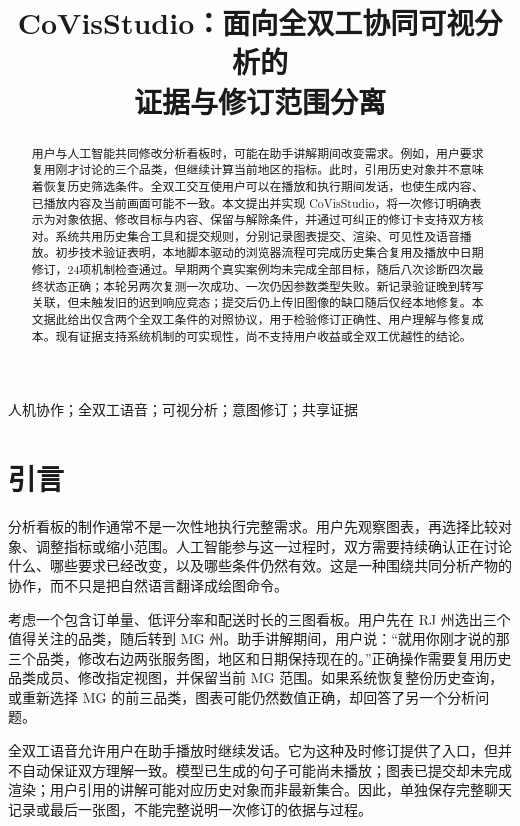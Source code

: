 \documentclass[conference]{IEEEtran}
\title{CoVisStudio：面向全双工协同可视分析的\\证据与修订范围分离}
\author{\IEEEauthorblockN{匿名作者：中文审阅稿}
\IEEEauthorblockA{方法、系统实现与初步技术验证\\正式用户对照实验尚未开展}}
\newcommand{\sys}{CoVisStudio}
\begin{document}
\maketitle

\begin{abstract}
用户与人工智能共同修改分析看板时，可能在助手讲解期间改变需求。例如，用户要求复用刚才讨论的三个品类，但继续计算当前地区的指标。此时，引用历史对象并不意味着恢复历史筛选条件。全双工交互使用户可以在播放和执行期间发话，也使生成内容、已播放内容及当前画面可能不一致。本文提出并实现 \sys，将一次修订明确表示为对象依据、修改目标与内容、保留与解除条件，并通过可纠正的修订卡支持双方核对。系统共用历史集合工具和提交规则，分别记录图表提交、渲染、可见性及语音播放。初步技术验证表明，本地脚本驱动的浏览器流程可完成历史集合复用及播放中日期修订，24项机制检查通过。早期两个真实案例均未完成全部目标，随后八次诊断四次最终状态正确；本轮另两次复测一次成功、一次仍因参数类型失败。新记录验证晚到转写关联，但未触发旧的迟到响应竞态；提交后仍上传旧图像的缺口随后仅经本地修复。本文据此给出仅含两个全双工条件的对照协议，用于检验修订正确性、用户理解与修复成本。现有证据支持系统机制的可实现性，尚不支持用户收益或全双工优越性的结论。
\end{abstract}
\begin{IEEEkeywords}
人机协作；全双工语音；可视分析；意图修订；共享证据
\end{IEEEkeywords}

\section{引言}
分析看板的制作通常不是一次性地执行完整需求。用户先观察图表，再选择比较对象、调整指标或缩小范围。人工智能参与这一过程时，双方需要持续确认正在讨论什么、哪些要求已经改变，以及哪些条件仍然有效。这是一种围绕共同分析产物的协作，而不只是把自然语言翻译成绘图命令。

考虑一个包含订单量、低评分率和配送时长的三图看板。用户先在 RJ 州选出三个值得关注的品类，随后转到 MG 州。助手讲解期间，用户说：“就用你刚才说的那三个品类，修改右边两张服务图，地区和日期保持现在的。”正确操作需要复用历史品类成员、修改指定视图，并保留当前 MG 范围。如果系统恢复整份历史查询，或重新选择 MG 的前三品类，图表可能仍然数值正确，却回答了另一个分析问题。

全双工语音允许用户在助手播放时继续发话。它为这种及时修订提供了入口，但并不自动保证双方理解一致。模型已生成的句子可能尚未播放；图表已提交却未完成渲染；用户引用的讲解可能对应历史对象而非最新集合。因此，单独保存完整聊天记录或最后一张图，不能完整说明一次修订的依据与过程。
\end{document}
